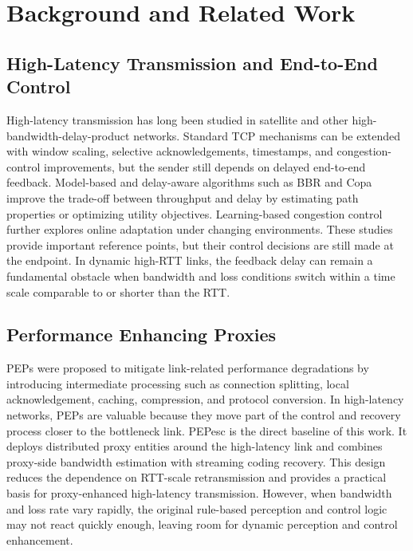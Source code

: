 \section{Background and Related Work}
\label{sec:related}

\subsection{High-Latency Transmission and End-to-End Control}
High-latency transmission has long been studied in satellite and other high-bandwidth-delay-product networks. Standard TCP mechanisms can be extended with window scaling, selective acknowledgements, timestamps, and congestion-control improvements, but the sender still depends on delayed end-to-end feedback. Model-based and delay-aware algorithms such as BBR and Copa improve the trade-off between throughput and delay by estimating path properties or optimizing utility objectives. Learning-based congestion control further explores online adaptation under changing environments. These studies provide important reference points, but their control decisions are still made at the endpoint. In dynamic high-RTT links, the feedback delay can remain a fundamental obstacle when bandwidth and loss conditions switch within a time scale comparable to or shorter than the RTT.

\subsection{Performance Enhancing Proxies}
PEPs were proposed to mitigate link-related performance degradations by introducing intermediate processing such as connection splitting, local acknowledgement, caching, compression, and protocol conversion. In high-latency networks, PEPs are valuable because they move part of the control and recovery process closer to the bottleneck link. PEPesc is the direct baseline of this work. It deploys distributed proxy entities around the high-latency link and combines proxy-side bandwidth estimation with streaming coding recovery. This design reduces the dependence on RTT-scale retransmission and provides a practical basis for proxy-enhanced high-latency transmission. However, when bandwidth and loss rate vary rapidly, the original rule-based perception and control logic may not react quickly enough, leaving room for dynamic perception and control enhancement.

